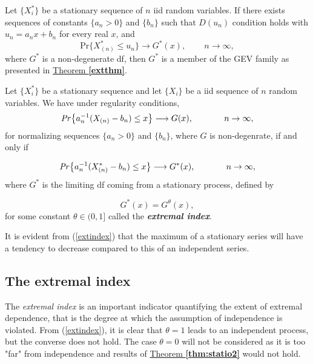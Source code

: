 \begin{theorem}
	Let $\{X^*_i\}$ be a stationary sequence of $n$ iid random variables. If there exists sequences of constants $\{a_n>0\}$ and $\{b_n\}$ such that $D(u_n)$ condition holds with $u_n=a_nx+b_n$ for every real $x$, and	
	\begin{equation}
	\text{Pr}\{X^*_{(n)}\leq u_n\}\longrightarrow G^*(x), \ \ \ \ \ \ \ \, \ \ n\rightarrow\infty,
	\end{equation}
	where $G^*$ is a non-degenerate df, then $G^*$ is a member of the GEV family as presented in \hyperref[extthm]{Theorem \textbf{\ref{extthm}}}.
	
\end{theorem}


\begin{theorem}\label{thm:statio2}
	Let $\{X^*_i\}$ be a stationary sequence and let $\{X_i\}$ be a iid sequence of $n$ random variables. We have under regularity conditions, 
	\begin{equation*}
	\text{\emph{Pr}}\big\{a_n^{-1}(X_{(n)}-b_n)\leq x\big\}\longrightarrow G(x), \ \ \ \ \ \ \ \ \ \ \ n\rightarrow \infty,
	\end{equation*}
	for normalizing sequences $\{a_n>0\}$ and $\{b_n\}$, where $G$ is non-degenrate, if and only if 
	
	\begin{equation*}\label{extremindex}
	\text{\emph{Pr}}\big\{a_n^{-1}(X^*_{(n)}-b_n)\leq x \big\}\longrightarrow G^*(x), \ \ \ \ \ \ \ \ \ \ \  n\rightarrow\infty,
	\end{equation*}
	where $G^*$ is the limiting df coming from a stationary process, defined by
	
	\begin{equation}\label{extindex}
	G^*(x)=G^{\theta}(x),
	\end{equation}
	for some constant $\theta\in (0,1]$ called the \emph{\textbf{extremal index}}.
	
\end{theorem}
It is evident from (\ref{extindex}) that the maximum of a stationary series will have a tendency to decrease compared to this of an independent series.

\subsection{The extremal index}
The \emph{extremal index} is an important indicator quantifying the extent of extremal dependence, that is the degree at which the assumption of independence is violated. From (\ref{extindex}), it is clear that $\theta=1$ leads to an independent process, but the converse does not hold. The case $\theta= 0$ will not be considered as it is too "far" from independence and results of \hyperref[thm:statio2]{Theorem \textbf{\ref{thm:statio2}}} would not hold.

